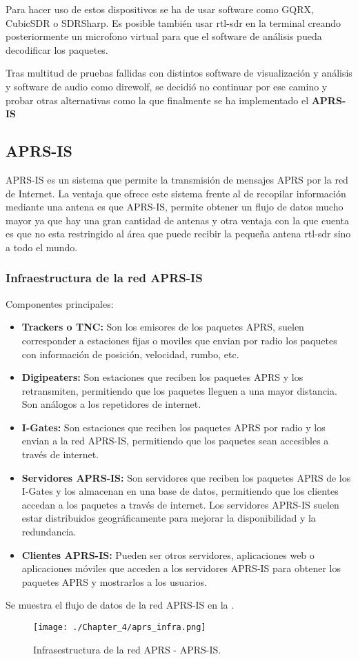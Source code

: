 Para hacer uso de estos dispositivos se ha de usar software como GQRX, CubicSDR o SDRSharp. Es posible también usar rtl-sdr en la terminal creando posteriormente un microfono virtual para que el software de análisis pueda decodificar los paquetes.

Tras multitud de pruebas fallidas con distintos software de visualización y análisis y software de audio como direwolf, se decidió no continuar por ese camino y probar otras alternativas como la que finalmente se ha implementado el \textbf{APRS-IS} 

\subsection{APRS-IS}
APRS-IS es un sistema que permite la transmisión de mensajes APRS por la red de Internet. La ventaja que ofrece este sistema frente al de recopilar información mediante una antena es que APRS-IS, permite obtener un flujo de datos mucho mayor ya que hay una gran cantidad de antenas y otra ventaja con la que cuenta es que no esta restringido al área que puede recibir la pequeña antena rtl-sdr sino a todo el mundo.

\subsubsection{Infraestructura de la red APRS-IS}
Componentes principales:
\begin{itemize}
	\item \textbf{Trackers o TNC:} Son los emisores de los paquetes APRS, suelen corresponder a estaciones fijas o moviles que envian por radio los paquetes con información de posición, velocidad, rumbo, etc.
	\item \textbf{Digipeaters:} Son estaciones que reciben los paquetes APRS y los retransmiten, permitiendo que los paquetes lleguen a una mayor distancia. Son análogos a los repetidores de internet.
	\item \textbf{I-Gates:} Son estaciones que reciben los paquetes APRS por radio y los envian a la red APRS-IS, permitiendo que los paquetes sean accesibles a través de internet.
	\item \textbf{Servidores APRS-IS:} Son servidores que reciben los paquetes APRS de los I-Gates y los almacenan en una base de datos, permitiendo que los clientes accedan a los paquetes a través de internet. Los servidores APRS-IS suelen estar distribuidos geográficamente para mejorar la disponibilidad y la redundancia.
	\item \textbf{Clientes APRS-IS:} Pueden ser otros servidores, aplicaciones web o aplicaciones móviles que acceden a los servidores APRS-IS para obtener los paquetes APRS y mostrarlos a los usuarios. 
\end{itemize}
Se muestra el flujo de datos de la red APRS-IS en la .
\begin{figure}[!h]
	\centering 
	\texttt{[image: ./Chapter\_4/aprs\_infra.png]}
	\caption{Infrasestructura de la red APRS - APRS-IS.}
	\label{fig:aprs-infra}
\end{figure}

